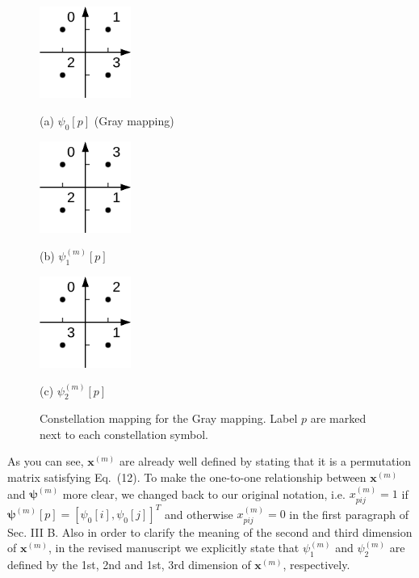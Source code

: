 \documentclass[onecolumn, 11pt, draftclsnofoot]{IEEEtran}
\begin{document}
\begin{figure}[h]
  \begin{minipage}[b]{0.32\linewidth}
    \centering
    \centerline{\includegraphics[width=3.0cm]{./figs/gray.pdf}}
    \centerline{(a) $\psi_0[p]$ (Gray mapping)}
    \medskip
  \end{minipage}
  \hfill
  \begin{minipage}[b]{.32\linewidth}
    \centering
    \centerline{\includegraphics[width=3.0cm]{./figs/tx1.pdf}}
    \centerline{(b) $\psi_1^{(m)}[p]$}
    \medskip
  \end{minipage}
  \hfill
  \begin{minipage}[b]{.32\linewidth}
    \centering
    \centerline{\includegraphics[width=3.0cm]{./figs/tx2.pdf}}
    \centerline{(c) $\psi_2^{(m)}[p]$}
    \medskip
  \end{minipage}
  \caption{Constellation mapping for the Gray mapping. Label $p$
  are marked next to each constellation symbol.}
  \label{fig:mapping}
\end{figure}

As you can see, $\mathbf{x}^{(m)}$ are already well defined by stating that
it is a permutation matrix satisfying Eq.~(12). To make the one-to-one
relationship between $\mathbf{x}^{(m)}$ and $\bm{\psi}^{(m)}$ more clear, we
changed back to our original notation, i.e. $x_{pij}^{(m)}
= 1$ if $ \bm{\psi}^{(m)}[p] = [\psi_0[i], \psi_0[j]]^T$ and otherwise $x_{pij}^{(m)} =
0$ in the first paragraph of Sec. III B. Also in order to clarify the meaning of
the second and third dimension of $\mathbf{x}^{(m)}$, in the revised manuscript
we explicitly state that $\psi_1^{(m)}$ and $\psi_2^{(m)}$ are defined by the
1st, 2nd and 1st, 3rd dimension of $\mathbf{x}^{(m)}$, respectively.
\end{document}
